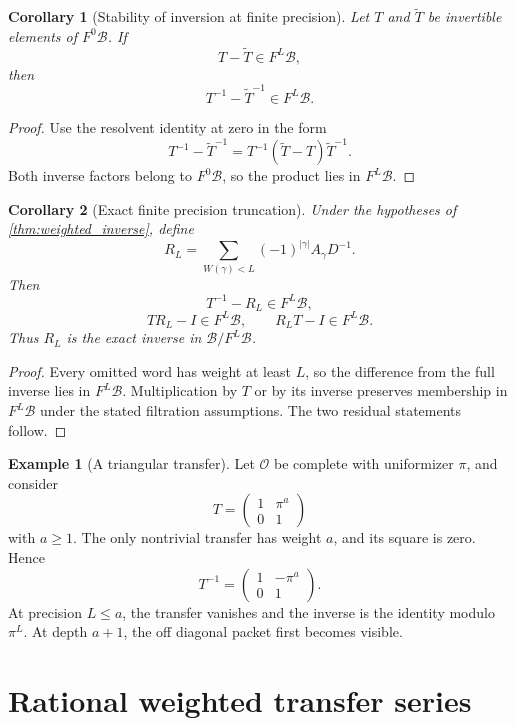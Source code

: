 \documentclass{aomart}
\newtheorem{corollary}[corollary]{Corollary}
\theoremstyle{definition}
\newtheorem{example}[example]{Example}
\theoremstyle{remark}
\newcommand{\OO}{\mathcal O}
\newcommand{\Bcal}{\mathcal B}
\begin{document}
\begin{corollary}[Stability of inversion at finite precision]\label{cor:inverse_stability}
Let $T$ and $\widetilde T$ be invertible elements of $F^0\Bcal$.  If
\[
T-\widetilde T\in F^L\Bcal,
\]
then
\[
T^{-1}-\widetilde T^{-1}\in F^L\Bcal.
\]
\end{corollary}

\begin{proof}
Use the resolvent identity at zero in the form
\[
T^{-1}-\widetilde T^{-1}
=
T^{-1}(\widetilde T-T)\widetilde T^{-1}.
\]
Both inverse factors belong to $F^0\Bcal$, so the product lies in $F^L\Bcal$.
\end{proof}

\begin{corollary}[Exact finite precision truncation]\label{cor:finite_precision}
Under the hypotheses of \cref{thm:weighted_inverse}, define
\[
R_L
=
\sum_{W(\gamma)<L}(-1)^{|\gamma|}A_\gamma D^{-1}.
\]
Then
\[
T^{-1}-R_L\in F^L\Bcal,
\]
\[
TR_L-I\in F^L\Bcal,
\qquad
R_LT-I\in F^L\Bcal.
\]
Thus $R_L$ is the exact inverse in $\Bcal/F^L\Bcal$.
\end{corollary}

\begin{proof}
Every omitted word has weight at least $L$, so the difference from the full inverse lies in $F^L\Bcal$.  Multiplication by $T$ or by its inverse preserves membership in $F^L\Bcal$ under the stated filtration assumptions.  The two residual statements follow.
\end{proof}

\begin{example}[A triangular transfer]\label{ex:triangular_transfer}
Let $\OO$ be complete with uniformizer $\pi$, and consider
\[
T=
\begin{pmatrix}
1&\pi^a\\
0&1
\end{pmatrix}
\]
with $a\geq1$.  The only nontrivial transfer has weight $a$, and its square is zero.  Hence
\[
T^{-1}
=
\begin{pmatrix}
1&-\pi^a\\
0&1
\end{pmatrix}.
\]
At precision $L\leq a$, the transfer vanishes and the inverse is the identity modulo $\pi^L$.  At depth $a+1$, the off diagonal packet first becomes visible.
\end{example}

\section{Rational weighted transfer series}\label{sec:path_series}
\end{document}
